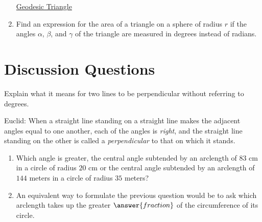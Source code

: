 \documentclass{ximera}
\begin{document}
\begin{question}
\begin{enumerate}
\begin{onlineOnly}
    \begin{center}
\end{center}
\end{onlineOnly}



\href{https://www.desmos.com/3d/91881c3088}{Geodesic Triangle}

\item Find an expression for the area of a triangle on a sphere of radius $r$ if the angles $\alpha$, $\beta$, and $\gamma$ of the triangle are measured in degrees instead of radians.  

\end{enumerate}

\end{question}

\section{Discussion Questions}

\begin{question} \label{QLKFrefvbb}
Explain what it means for two lines to be perpendicular without referring to degrees.

\begin{expandable}
Euclid: When a straight line standing on a straight line makes the adjacent angles equal to one another, each of the angles is \emph{right}, and the straight line standing on the other is called a \emph{perpendicular} to that on which it stands.
\end{expandable}
\end{question}


\begin{question} \label{Q3423ghy55}
\begin{enumerate}
\item Which angle is greater, the central angle subtended by an arclength of $83$ cm in a circle of radius $20$ cm or the central angle subtended by an arclength of $144$ meters in a circle of radius $35$ meters?

\item An equivalent way to formulate the previous question would be to ask which arclength takes up the greater $\answer{fraction}$ of the circumference of its circle.
\end{enumerate}

\end{question}
\end{document}
